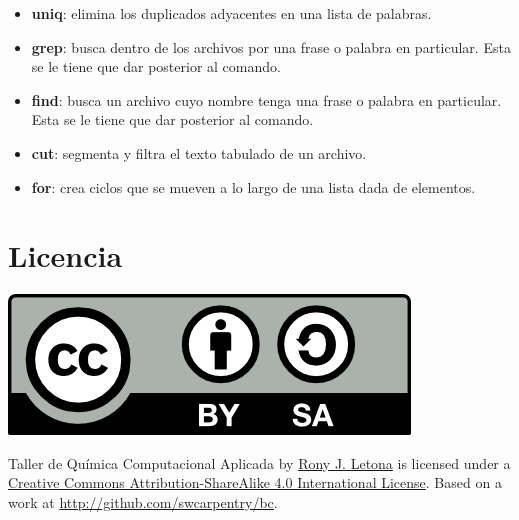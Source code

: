\documentclass[10pt,letterpaper]{article}
\begin{document}
\begin{small}
\begin{itemize}
\item \textbf{uniq}: elimina los duplicados adyacentes en una lista de palabras.
\item \textbf{grep}: busca dentro de los archivos por una frase o palabra en particular. Esta se le tiene que dar posterior al comando.
\item \textbf{find}: busca un archivo cuyo nombre tenga una frase o palabra en particular. Esta se le tiene que dar posterior al comando.
\item \textbf{cut}: segmenta y filtra el texto tabulado de un archivo.
\item \textbf{for}: crea ciclos que se mueven a lo largo de una lista dada de elementos.
\end{itemize}
\end{small}

\section*{Licencia}

\noindent \includegraphics{img/cc_big.png}

\noindent Taller de Qu\'imica Computacional Aplicada by \href{http://github.com/zronyj/TQCA}{Rony J. Letona} is licensed under a \href{http://creativecommons.org/licenses/by-sa/4.0/}{Creative Commons Attribution-ShareAlike 4.0 International License}.
Based on a work at \url{http://github.com/swcarpentry/bc}.
\end{document}
